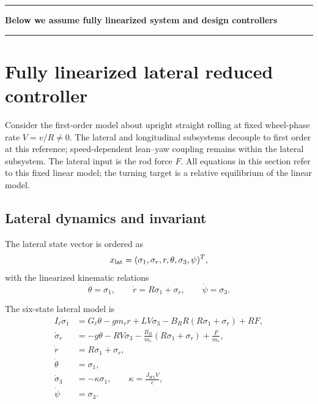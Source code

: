 \par\medskip
\noindent\rule{\linewidth}{0.2pt}

\textbf{Below we assume fully linearized system and design controllers}

\noindent\rule{\linewidth}{0.2pt}
\par\medskip

\section{Fully linearized lateral reduced controller}

Consider the first-order model about upright straight rolling
at fixed wheel-phase rate $V=v/R\ne0$.
The lateral and longitudinal subsystems decouple to first order
at this reference; speed-dependent lean--yaw coupling remains within
the lateral subsystem. The lateral input is the rod force $F$.
All equations in this section refer to this fixed linear model;
the turning target is a relative equilibrium of the linear model.

\subsection{Lateral dynamics and invariant}

The lateral state vector is ordered as
\begin{equation}
x_{\rm lat}
=(\sigma_1,\sigma_r,r,\theta,\sigma_3,\psi)^T,
\end{equation}
with the linearized kinematic relations
\begin{equation}
\dot\theta=\sigma_1,\qquad
\dot r=R\sigma_1+\sigma_r,\qquad
\dot\psi=\sigma_3.
\end{equation}

The six-state lateral model is
\begin{equation}
\begin{aligned}
I_\ell\dot\sigma_1
  &=G_\ell\theta-gm_r r+LV\sigma_3
    -B_RR(R\sigma_1+\sigma_r)+RF,\\
\dot\sigma_r
  &=-g\theta-RV\sigma_3
    -\frac{B_R}{m_r}(R\sigma_1+\sigma_r)
    +\frac{F}{m_r},\\
\dot r&=R\sigma_1+\sigma_r,\\
\dot\theta&=\sigma_1,\\
\dot\sigma_3&=-\kappa\sigma_1,
\qquad \kappa=\frac{J_{W1}V}{c},\\
\dot\psi&=\sigma_3.
\end{aligned}
\end{equation}

